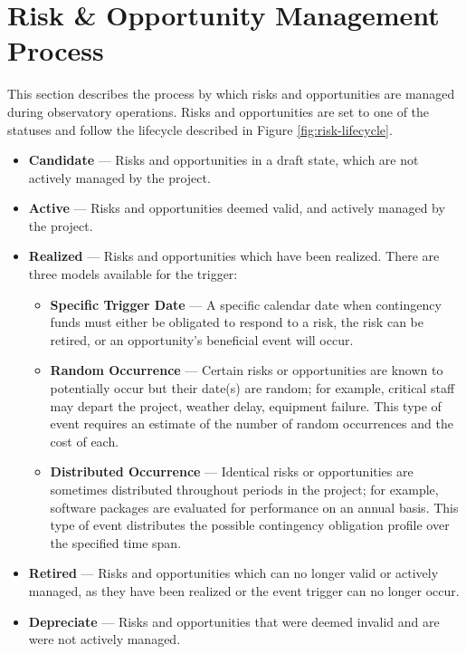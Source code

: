 \section{Risk \& Opportunity Management Process}
\label{sec:process}

This section describes the process by which risks and opportunities are managed during observatory operations.
Risks and opportunities are set to one of the statuses and follow the lifecycle described in Figure \ref{fig:risk-lifecycle}.

\begin{itemize}
	\item \textbf{Candidate} ---
	Risks and opportunities in a draft state, which are not actively managed by the project.

	\item \textbf{Active} ---
	Risks and opportunities deemed valid, and actively managed by the project.

	\item \textbf{Realized} ---
	Risks and opportunities which have been realized.
	There are three models available for the trigger:
		\begin{itemize}
			\item \textbf{Specific Trigger Date} ---
			A specific calendar date when contingency funds must either be obligated to respond to a risk, the risk can be retired, or an opportunity's beneficial event will occur.
			
			\item \textbf{Random Occurrence} ---
			Certain risks or opportunities are known to potentially occur but their date(s) are random; for example, critical staff may depart the project, weather delay, equipment failure.
			This type of event requires an estimate of the number of random occurrences and the cost of each.

			\item \textbf{Distributed Occurrence} ---
			Identical risks or opportunities are sometimes distributed throughout periods in the project; for example, software packages are evaluated for performance on an annual basis.
			This type of event distributes the possible contingency obligation profile over the specified time span.
		\end{itemize}

	\item \textbf{Retired} ---
	Risks and opportunities which can no longer valid or actively managed, as they have been realized or the event trigger can no longer occur.

	\item \textbf{Depreciate} ---
	Risks and opportunities that were deemed invalid and are were not actively managed.
\end{itemize}	

